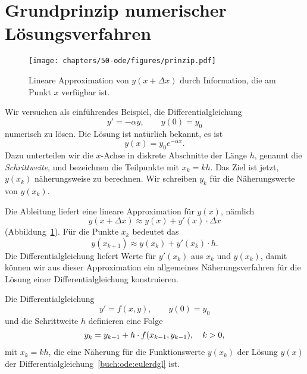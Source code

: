 %
%
%
\section{Grundprinzip numerischer Lösungsverfahren}
\begin{figure}
\centering
\texttt{[image: chapters/50-ode/figures/prinzip.pdf]}
\caption{Lineare Approximation von $y(x+\Delta x)$ durch Information,
die am Punkt $x$ verfügbar ist.
\label{buch:ode:lineareapproximation}}
\end{figure}
Wir versuchen als einführendes Beispiel, die Differentialgleichung
\begin{equation}
y'=-\alpha y,\qquad y(0)=y_0
\label{buch:ode:expdgl}
\end{equation}
numerisch zu lösen. 
Die Lösung ist natürlich bekannt, es ist 
\begin{equation}
y(x)=y_0e^{-\alpha x}.
\label{buch:ode:beispiel-loesung}
\end{equation}
Dazu unterteilen wir die $x$-Achse in diskrete Abschnitte der Länge $h$,
genannt die {\em Schrittweite},
%
und bezeichnen die Teilpunkte mit $x_k=kh$.
Das Ziel ist jetzt, $y(x_k)$ näherungsweise zu berechnen.
Wir schreiben $y_k$ für die Näherungswerte von $y(x_k)$.

Die Ableitung liefert eine lineare Approximation für $y(x)$,
%
%
nämlich
\[
y(x+\Delta x)\approx y(x) + y'(x)\cdot\Delta x
\]
(Abbildung~\ref{buch:ode:lineareapproximation}).
Für die Punkte $x_k$ bedeutet das
\[
y(x_{k+1})\approx y(x_{k})+y'(x_k)\cdot h.
\]
Die Differentialgleichung liefert Werte für $y'(x_k)$ aus $x_k$ und $y(x_k)$,
damit können wir aus dieser Approximation ein allgemeines
Näherungsverfahren für die Lösung einer Differentialgleichung
konstruieren.
%

\begin{satz}
\label{buch:satz:euler-verfahren}
%
Die Differentialgleichung
\begin{equation}
y'=f(x,y),\qquad y(0)=y_0
\label{buch:ode:eulerdgl}
\end{equation}
und die Schrittweite $h$ definieren eine Folge 
\[
y_{\mathstrut k}=y_{k-1} + h\cdot f(x_{k-1}, y_{k-1}),\quad k>0,
\]
mit $x_k=kh$,
die eine Näherung für die Funktionswerte $y(x_k)$ der Lösung $y(x)$
der Differentialgleichung~\eqref{buch:ode:eulerdgl} ist.
\end{satz}

